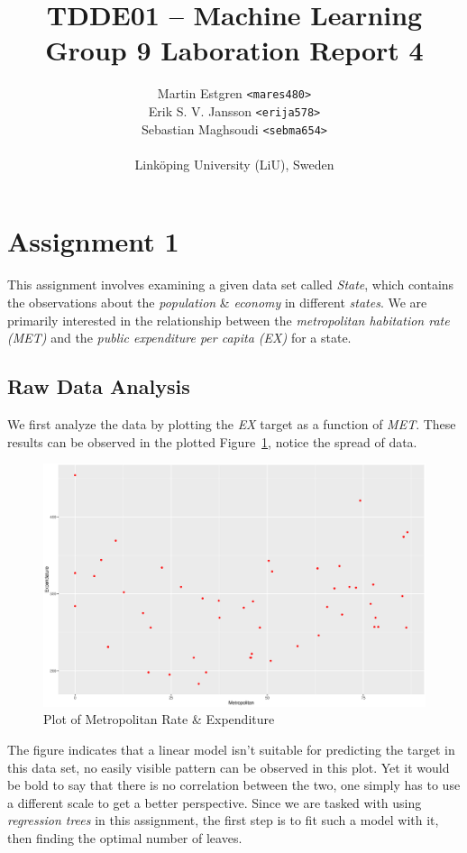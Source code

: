 \documentclass[a4paper,12pt]{article}
\title{TDDE01 -- Machine Learning \\
       Group 9 Laboration Report 4}
\author{{Martin Estgren \texttt{<mares480>}} \\
        {Erik S. V. Jansson \texttt{<erija578>}} \\
        {Sebastian Maghsoudi \texttt{<sebma654>}} \\~\\
        {Linköping University (LiU), Sweden}}
\begin{document}
    \maketitle %

    \section*{Assignment 1}

        This assignment involves examining a given data set called \emph{State}, which contains the observations about the \emph{population} \& \emph{economy} in different \emph{states}. We are primarily interested in the relationship between the \emph{metropolitan habitation rate (MET)} and the \emph{public expenditure per capita (EX)} for a state.

    \subsection*{Raw Data Analysis}

        We first analyze the data by plotting the \emph{EX} target as a function of \emph{MET}. These results can be observed in the plotted Figure~\ref{fig:state}, notice the spread of data.

        \begin{figure}[H]
            \centering
            \caption{Plot of Metropolitan Rate \& Expenditure}
            \label{fig:state}
            \includegraphics[width=\textwidth]{share/A1_data.eps}
        \end{figure}

        The figure indicates that a linear model isn't suitable for predicting the target in this data set, no easily visible pattern can be observed in this plot. Yet it would be bold to say that there is no correlation between the two, one simply has to use a different scale to get a better perspective. Since we are tasked with using \emph{regression trees} in this assignment, the first step is to fit such a model with it, then finding the optimal number of leaves.
\end{document}
